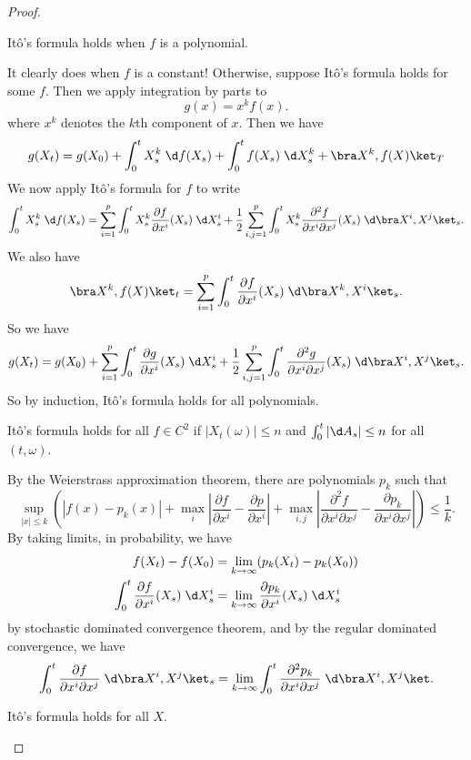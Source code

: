 \documentclass[a4paper]{article}
\begin{document}
\begin{proof}
  \begin{claim}
    It\^o's formula holds when $f$ is a polynomial.
  \end{claim}
  It clearly does when $f$ is a constant! Otherwise, suppose It\^o's formula holds for some $f$. Then we apply integration by parts to
  \[
    g(x) = x^k f(x).
  \]
  where $x^k$ denotes the $k$th component of $x$. Then we have
  \[
    g(X_t) = g(X_0) + \int_0^t X_s^k \;\d f(X_s) + \int_0^t f(X_s) \;\d X_s^k + \bra X^k, f(X)\ket_T
  \]
  We now apply It\^o's formula for $f$ to write
  \[
    \int_0^t X_s^k \;\d f(X_s) = \sum_{i = 1}^p \int_0^t X_s^k \frac{\partial f}{\partial x^i}(X_s) \;\d X_s^i + \frac{1}{2} \sum_{i, j = 1}^p \int_0^t X_s^k \frac{\partial^2f}{\partial x^i \partial x^j} (X_s)\;\d \bra X^i, X^j\ket_s.
  \]
  We also have
  \[
    \bra X^k, f(X)\ket_t = \sum_{i = 1}^p \int_0^t \frac{\partial f}{\partial x^i}(X_s) \;\d \bra X^k, X^i\ket_s.
  \]
  So we have
  \[
    g(X_t) = g(X_0) + \sum_{i = 1}^p \int_0^t \frac{\partial g}{\partial x^i}(X_s) \;\d X_s^i + \frac{1}{2} \sum_{i, j = 1}^p \int_0^t \frac{\partial^2 g}{\partial x^i \partial x^j} (X_s) \;\d \bra X^i, X^j\ket_s.
  \]
  So by induction, It\^o's formula holds for all polynomials.

  \begin{claim}
    It\^o's formula holds for all $f \in C^2$ if $|X_t(\omega)| \leq n$ and $\int_0^t |\d A_s| \leq n$ for all $(t, \omega)$.
  \end{claim}

  By the Weierstrass approximation theorem, there are polynomials $p_k$ such that
  \[
    \sup_{|x| \leq k} \left(|f(x) - p_k(x)| + \max_i \left|\frac{\partial f}{\partial x^i} - \frac{\partial p}{\partial x^i}\right| + \max_{i, j} \left|\frac{\partial^2 f}{\partial x^i \partial x^j} - \frac{\partial p_k}{\partial x^i \partial x^j}\right| \right) \leq \frac{1}{k}.
  \]
  By taking limits, in probability, we have
  \begin{align*}
    f(X_t) - f(X_0) &= \lim_{k \to \infty} (p_k(X_t) - p_k(X_0))\\
    \int_0^t \frac{\partial f}{\partial x^i} (X_s) \;\d X_s^i &= \lim_{k \to \infty} \frac{\partial p_k}{\partial x^i} (X_s) \;\d X_s^i
  \end{align*}
  by stochastic dominated convergence theorem, and by the regular dominated convergence, we have
  \[
    \int_0^t \frac{\partial f}{\partial x^i \partial x^j} \;\d \bra X^i, X^j\ket_s = \lim_{k \to \infty} \int_0^t \frac{\partial^2 p_k}{\partial x^i \partial x^j} \;\d \bra X^i, X^j\ket.
  \]
  \begin{claim}
    It\^o's formula holds for all $X$.
  \end{claim}


\end{proof}
\end{document}
